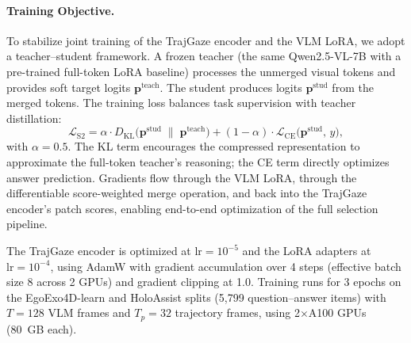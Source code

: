 \paragraph{Training Objective.}
To stabilize joint training of the TrajGaze encoder and the VLM LoRA, we adopt a
teacher--student framework.
A frozen teacher (the same Qwen2.5-VL-7B with a pre-trained full-token LoRA baseline)
processes the unmerged visual tokens and provides soft target logits
$\mathbf{p}^{\mathrm{teach}}$.
The student produces logits $\mathbf{p}^{\mathrm{stud}}$ from the merged tokens.
The training loss balances task supervision with teacher distillation:
\begin{equation}
    \mathcal{L}_{\mathrm{S2}} =
        \alpha \cdot D_{\mathrm{KL}}\!\bigl(
            \mathbf{p}^{\mathrm{stud}} \;\|\; \mathbf{p}^{\mathrm{teach}}
        \bigr)
        + (1{-}\alpha) \cdot \mathcal{L}_{\mathrm{CE}}\!\bigl(
            \mathbf{p}^{\mathrm{stud}},\, y
        \bigr),
    \label{eq:stage2_loss}
\end{equation}
with $\alpha{=}0.5$.
The KL term encourages the compressed representation to approximate the full-token
teacher's reasoning; the CE term directly optimizes answer prediction.
Gradients flow through the VLM LoRA, through the differentiable score-weighted merge
operation, and back into the TrajGaze encoder's patch scores, enabling end-to-end
optimization of the full selection pipeline.

The TrajGaze encoder is optimized at $\mathrm{lr}{=}10^{-5}$ and the LoRA adapters at
$\mathrm{lr}{=}10^{-4}$, using AdamW with gradient accumulation over 4 steps
(effective batch size 8 across 2 GPUs) and gradient clipping at 1.0.
Training runs for 3 epochs on the EgoExo4D-learn and HoloAssist splits
(5{,}799 question--answer items) with $T{=}128$ VLM frames and $T_p{=}32$
trajectory frames, using 2$\times$A100 GPUs (80~GB each).
